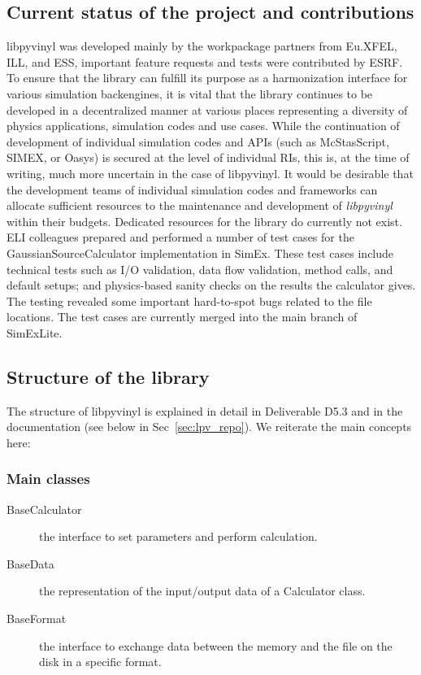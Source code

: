 \documentclass[11pt, a4paper]{article}
\begin{document}
\subsection{Current status of the project and contributions}
\label{sec:lpv_status}
libpyvinyl was developed mainly by the workpackage partners from
Eu.XFEL, ILL, and ESS, important feature requests and tests were contributed by
ESRF. To ensure that the library can fulfill its purpose as a harmonization
interface for various simulation backengines, it is vital that the library
continues to be developed in a decentralized manner at various places
representing a diversity of physics applications, simulation codes and use
cases. While the continuation of development of individual simulation codes and
APIs (such as McStasScript, SIMEX, or Oasys) is secured at the level of
individual RIs, this is, at the time of writing, much more uncertain in the case
of libpyvinyl. It would be desirable that the development teams of
individual simulation codes and frameworks can allocate sufficient resources to
the maintenance and development of \textit{libpyvinyl} within their budgets.
Dedicated resources for the  library do currently not exist. ELI colleagues prepared and performed a number of test cases for the GaussianSourceCalculator implementation in SimEx. These test cases include technical tests such as I/O validation, data flow validation, method calls, and default setups; and physics-based sanity checks on the results the calculator gives. The testing revealed some important hard-to-spot bugs related to the file locations. The test cases are currently merged into the main branch of SimExLite.

\subsection{Structure of the library}
\label{sec:lpv_structure}
The structure of libpyvinyl is explained in detail in Deliverable D5.3
and in the documentation (see below in Sec~\ref{sec:lpv_repo}). We reiterate the
main concepts here:

\subsubsection{Main classes}
\label{sec:lpv_main_classes}

\begin{description}
\item[BaseCalculator] the interface to set parameters and perform calculation.
\item[BaseData]   the representation of the input/output data of a Calculator class.
\item[BaseFormat]   the interface to exchange data between the memory and the file on the disk in a specific format.
\end{description}
\end{document}
